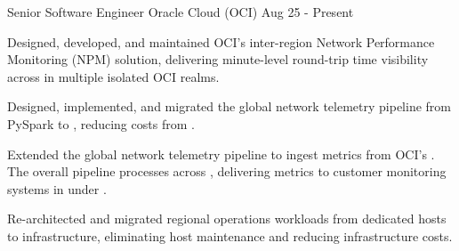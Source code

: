 \begin{cventries}
  \cventry
    {Senior Software Engineer}
    {Oracle Cloud (OCI)}
    {Aug 25 - Present}
    {}
    {
      \begin{cvitems}
        \item {Designed, developed, and maintained OCI’s  inter-region Network Performance Monitoring (NPM) solution, delivering minute-level round-trip time visibility across  in multiple isolated OCI realms.}
        \item {Designed, implemented, and migrated the global network telemetry pipeline from PySpark to , reducing costs from .}
        \item {Extended the global network telemetry pipeline to ingest metrics from OCI's . The overall pipeline processes  across , delivering metrics to customer monitoring systems in under .}
        \item {Re-architected and migrated regional operations workloads from dedicated hosts to  infrastructure, eliminating host maintenance and reducing infrastructure costs.}
      \end{cvitems}
    }
  

\end{cventries}

